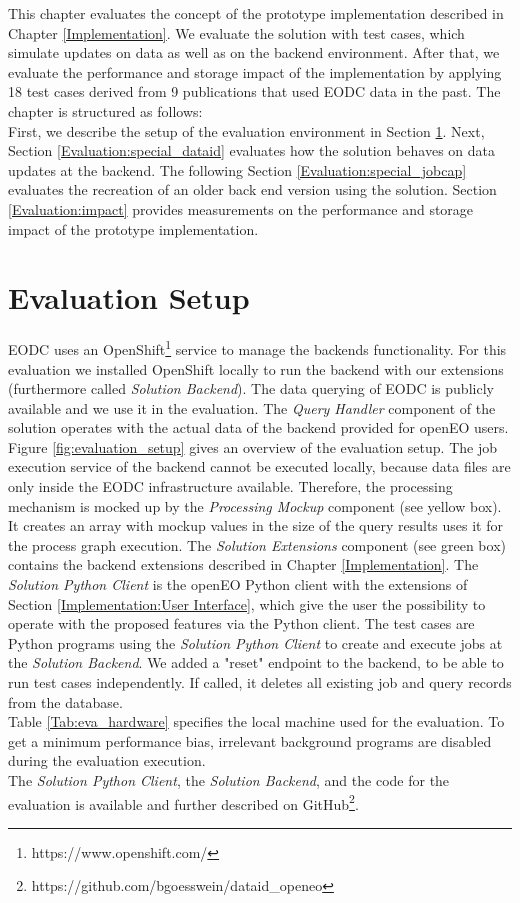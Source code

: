 \documentclass[draft,final]{vutinfth} %
\begin{document}
This chapter evaluates the concept of the prototype implementation described in Chapter \ref{Implementation}. We evaluate the solution with test cases, which simulate updates on data as well as on the backend environment. After that, we evaluate the performance and storage impact of the implementation by applying 18 test cases derived from 9 publications that used EODC data in the past. The chapter is structured as follows: \\
First, we describe the setup of the evaluation environment in Section \ref{Evaluation:Setup}. Next, Section \ref{Evaluation:special_dataid} evaluates how the solution behaves on data updates at the backend. The following Section \ref{Evaluation:special_jobcap} evaluates the recreation of an older back end version using the solution. Section \ref{Evaluation:impact} provides measurements on the performance and storage impact of the prototype implementation. 

\section{Evaluation Setup}\label{Evaluation:Setup}

EODC uses an OpenShift\footnote{https://www.openshift.com/} service to manage the backends functionality. For this evaluation we installed OpenShift locally to run the backend with our extensions (furthermore called \textit{Solution Backend}). The data querying of EODC is publicly available and we use it in the evaluation. The \textit{Query Handler} component of the solution operates with the actual data of the backend provided for openEO users. \\
Figure \ref{fig:evaluation_setup} gives an overview of the evaluation setup. The job execution service of the backend cannot be executed locally, because data files are only inside the EODC infrastructure available. Therefore, the processing mechanism is mocked up by the \textit{Processing Mockup} component (see yellow box). It creates an array with mockup values in the size of the query results uses it for the process graph execution. The \textit{Solution Extensions} component (see green box) contains the backend extensions described in Chapter \ref{Implementation}. The \textit{Solution Python Client} is the openEO Python client with the extensions of Section \ref{Implementation:User Interface}, which give the user the possibility to operate with the proposed features via the Python client. The test cases are Python programs using the \textit{Solution Python Client} to create and execute jobs at the \textit{Solution Backend}.
We added a "reset" endpoint to the backend, to be able to run test cases independently. If called, it deletes all existing job and query records from the database. \\
Table \ref{Tab:eva_hardware} specifies the local machine used for the evaluation. To get a minimum performance bias, irrelevant background programs are disabled during the evaluation execution.\\  
The \textit{Solution Python Client}, the \textit{Solution Backend}, and the code for the evaluation is available and further described on GitHub\footnote{https://github.com/bgoesswein/dataid\_openeo}. 
\end{document}
